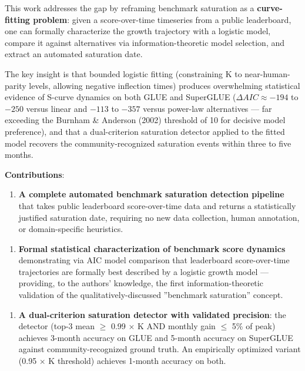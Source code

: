 This work addresses the gap by reframing benchmark saturation as a \textbf{curve-fitting problem}: given a score-over-time timeseries from a public leaderboard, one can formally characterize the growth trajectory with a logistic model, compare it against alternatives via information-theoretic model selection, and extract an automated saturation date.

The key insight is that bounded logistic fitting (constraining K to near-human-parity levels, allowing negative inflection times) produces overwhelming statistical evidence of S-curve dynamics on both GLUE and SuperGLUE ($\Delta AIC \approx -194$ to $-250$ versus linear and $-113$ to $-357$ versus power-law alternatives --- far exceeding the Burnham \& Anderson (2002) threshold of 10 for decisive model preference), and that a dual-criterion saturation detector applied to the fitted model recovers the community-recognized saturation events within three to five months.

\textbf{Contributions}:

\begin{enumerate}
\item \textbf{A complete automated benchmark saturation detection pipeline} that takes public leaderboard score-over-time data and returns a statistically justified saturation date, requiring no new data collection, human annotation, or domain-specific heuristics.
\end{enumerate}

\begin{enumerate}
\item \textbf{Formal statistical characterization of benchmark score dynamics} demonstrating via AIC model comparison that leaderboard score-over-time trajectories are formally best described by a logistic growth model --- providing, to the authors' knowledge, the first information-theoretic validation of the qualitatively-discussed ''benchmark saturation'' concept.
\end{enumerate}

\begin{enumerate}
\item \textbf{A dual-criterion saturation detector with validated precision}: the detector (top-3 mean $\geq$ 0.99 $\times$ K AND monthly gain $\leq$ 5\% of peak) achieves 3-month accuracy on GLUE and 5-month accuracy on SuperGLUE against community-recognized ground truth. An empirically optimized variant (0.95 $\times$ K threshold) achieves 1-month accuracy on both.
\end{enumerate}

